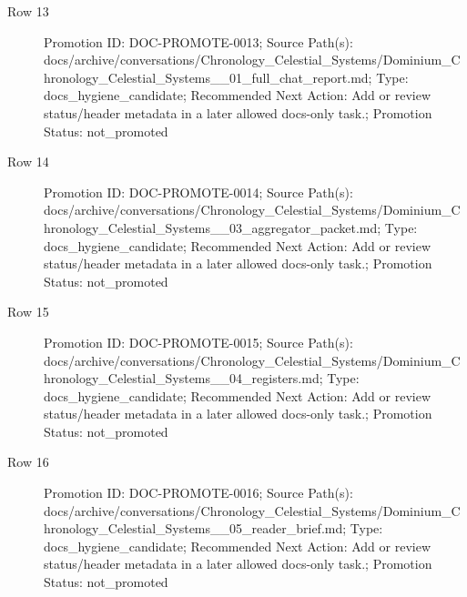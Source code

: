 \documentclass[10.5pt,a4paper,openany]{book}
\begin{document}
\begin{description}
\item[Row 13] Promotion ID: DOC-\allowbreak{}PROMOTE-\allowbreak{}0013; Source Path(s): docs/\allowbreak{}archive/\allowbreak{}conversations/\allowbreak{}Chronology\_\allowbreak{}Celestial\_\allowbreak{}Systems/\allowbreak{}Dominium\_\allowbreak{}Chronology\_\allowbreak{}Celestial\_\allowbreak{}Systems\_\allowbreak{}\_\allowbreak{}01\_\allowbreak{}full\_\allowbreak{}chat\_\allowbreak{}report.\allowbreak{}md; Type: docs\_\allowbreak{}hygiene\_\allowbreak{}candidate; Recommended Next Action: Add or review status/\allowbreak{}header metadata in a later allowed docs-\allowbreak{}only task.\allowbreak{}; Promotion Status: not\_\allowbreak{}promoted
\item[Row 14] Promotion ID: DOC-\allowbreak{}PROMOTE-\allowbreak{}0014; Source Path(s): docs/\allowbreak{}archive/\allowbreak{}conversations/\allowbreak{}Chronology\_\allowbreak{}Celestial\_\allowbreak{}Systems/\allowbreak{}Dominium\_\allowbreak{}Chronology\_\allowbreak{}Celestial\_\allowbreak{}Systems\_\allowbreak{}\_\allowbreak{}03\_\allowbreak{}aggregator\_\allowbreak{}packet.\allowbreak{}md; Type: docs\_\allowbreak{}hygiene\_\allowbreak{}candidate; Recommended Next Action: Add or review status/\allowbreak{}header metadata in a later allowed docs-\allowbreak{}only task.\allowbreak{}; Promotion Status: not\_\allowbreak{}promoted
\item[Row 15] Promotion ID: DOC-\allowbreak{}PROMOTE-\allowbreak{}0015; Source Path(s): docs/\allowbreak{}archive/\allowbreak{}conversations/\allowbreak{}Chronology\_\allowbreak{}Celestial\_\allowbreak{}Systems/\allowbreak{}Dominium\_\allowbreak{}Chronology\_\allowbreak{}Celestial\_\allowbreak{}Systems\_\allowbreak{}\_\allowbreak{}04\_\allowbreak{}registers.\allowbreak{}md; Type: docs\_\allowbreak{}hygiene\_\allowbreak{}candidate; Recommended Next Action: Add or review status/\allowbreak{}header metadata in a later allowed docs-\allowbreak{}only task.\allowbreak{}; Promotion Status: not\_\allowbreak{}promoted
\item[Row 16] Promotion ID: DOC-\allowbreak{}PROMOTE-\allowbreak{}0016; Source Path(s): docs/\allowbreak{}archive/\allowbreak{}conversations/\allowbreak{}Chronology\_\allowbreak{}Celestial\_\allowbreak{}Systems/\allowbreak{}Dominium\_\allowbreak{}Chronology\_\allowbreak{}Celestial\_\allowbreak{}Systems\_\allowbreak{}\_\allowbreak{}05\_\allowbreak{}reader\_\allowbreak{}brief.\allowbreak{}md; Type: docs\_\allowbreak{}hygiene\_\allowbreak{}candidate; Recommended Next Action: Add or review status/\allowbreak{}header metadata in a later allowed docs-\allowbreak{}only task.\allowbreak{}; Promotion Status: not\_\allowbreak{}promoted

\end{description}
\end{document}
